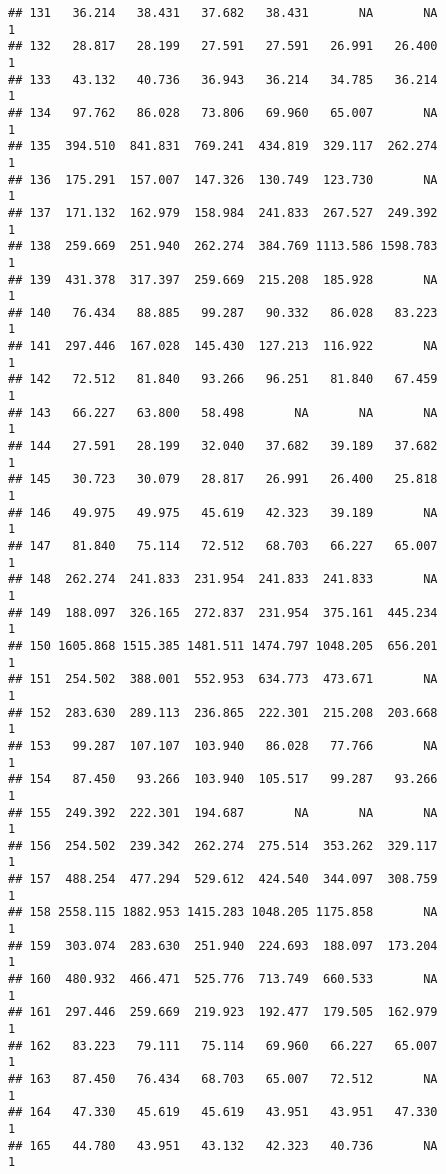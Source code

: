 \documentclass[
]{article}
\begin{document}
\begin{verbatim}
## 131   36.214   38.431   37.682   38.431       NA       NA             1
## 132   28.817   28.199   27.591   27.591   26.991   26.400             1
## 133   43.132   40.736   36.943   36.214   34.785   36.214             1
## 134   97.762   86.028   73.806   69.960   65.007       NA             1
## 135  394.510  841.831  769.241  434.819  329.117  262.274             1
## 136  175.291  157.007  147.326  130.749  123.730       NA             1
## 137  171.132  162.979  158.984  241.833  267.527  249.392             1
## 138  259.669  251.940  262.274  384.769 1113.586 1598.783             1
## 139  431.378  317.397  259.669  215.208  185.928       NA             1
## 140   76.434   88.885   99.287   90.332   86.028   83.223             1
## 141  297.446  167.028  145.430  127.213  116.922       NA             1
## 142   72.512   81.840   93.266   96.251   81.840   67.459             1
## 143   66.227   63.800   58.498       NA       NA       NA             1
## 144   27.591   28.199   32.040   37.682   39.189   37.682             1
## 145   30.723   30.079   28.817   26.991   26.400   25.818             1
## 146   49.975   49.975   45.619   42.323   39.189       NA             1
## 147   81.840   75.114   72.512   68.703   66.227   65.007             1
## 148  262.274  241.833  231.954  241.833  241.833       NA             1
## 149  188.097  326.165  272.837  231.954  375.161  445.234             1
## 150 1605.868 1515.385 1481.511 1474.797 1048.205  656.201             1
## 151  254.502  388.001  552.953  634.773  473.671       NA             1
## 152  283.630  289.113  236.865  222.301  215.208  203.668             1
## 153   99.287  107.107  103.940   86.028   77.766       NA             1
## 154   87.450   93.266  103.940  105.517   99.287   93.266             1
## 155  249.392  222.301  194.687       NA       NA       NA             1
## 156  254.502  239.342  262.274  275.514  353.262  329.117             1
## 157  488.254  477.294  529.612  424.540  344.097  308.759             1
## 158 2558.115 1882.953 1415.283 1048.205 1175.858       NA             1
## 159  303.074  283.630  251.940  224.693  188.097  173.204             1
## 160  480.932  466.471  525.776  713.749  660.533       NA             1
## 161  297.446  259.669  219.923  192.477  179.505  162.979             1
## 162   83.223   79.111   75.114   69.960   66.227   65.007             1
## 163   87.450   76.434   68.703   65.007   72.512       NA             1
## 164   47.330   45.619   45.619   43.951   43.951   47.330             1
## 165   44.780   43.951   43.132   42.323   40.736       NA             1

\end{verbatim}
\end{document}
